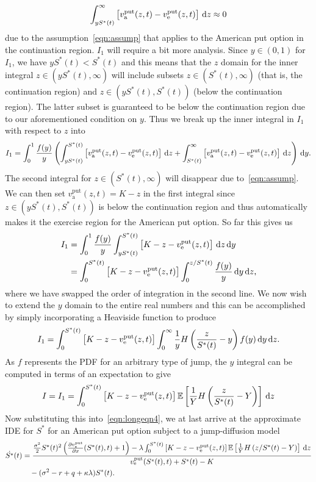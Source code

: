 	$$
		\int_{yS^*(t)}^\infty \left[v_{\text{a}}^{\text{put}}(z,t) -  v_{\text{e}}^{\text{put}}(z,t)\right] \, \mathrm d z \approx 0
	$$
due to the assumption~\eqref{eqn:assump} that applies to the American put option in the continuation region. $I_1$ will require a bit more analysis. Since $y \in (0,1)$ for $I_1$, we have $yS^*(t) < S^*(t)$ and this means that the $z$ domain for the inner integral $z \in (yS^*(t),\infty)$ will include subsets $z \in (S^*(t),\infty)$ (that is, the continuation region) and $z \in (yS^*(t),S^*(t))$ (below the continuation region). The latter subset is guaranteed to be below the continuation region due to our aforementioned condition on $y$. Thus we break up the inner integral in $I_1$ with respect to $z$ into
	$$
		I_1 = \int_0^1 \frac{f(y)}{y} \left( \int_{yS^*(t)}^{S^*(t)}  \left[v_{\text{a}}^{\text{put}}(z,t) -  v_{\text{e}}^{\text{put}}(z,t)\right] \, \mathrm d z +\int_{S^*(t)}^{\infty}  \left[v_{\text{a}}^{\text{put}}(z,t) -  v_{\text{e}}^{\text{put}}(z,t)\right] \, \mathrm d z \right) \, \mathrm d y.
	$$
The second integral for $z \in (S^*(t),\infty)$ will disappear due to~\eqref{eqn:assump}. We can then set $v_{\text{a}}^{\text{put}}(z,t) = K - z$ in the first integral since $z \in (yS^*(t),S^*(t))$ is below the continuation region and thus automatically makes it the exercise region for the American put option. So far this gives us
	\begin{align*}
		I_1 &= \int_0^1 \frac{f(y)}{y} \int_{yS^*(t)}^{S^*(t)}  \left[K - z -  v_{\text{e}}^{\text{put}}(z,t)\right] \, \mathrm d z \, \mathrm d y \\
		&= \int_0^{S^*(t)} \left[K - z -  v_{\text{e}}^{\text{put}}(z,t)\right]  \int_{0}^{z/S^*(t)} \frac{f(y)}{y}  \, \mathrm d y \, \mathrm d z,
	\end{align*}
	where we have swapped the order of integration in the second line. We now wish to extend the $y$ domain to the entire real numbers and this can be accomplished by simply incorporating a Heaviside function to produce
	$$
		I_1 = \int_0^{S^*(t)} \left[K - z -  v_{\text{e}}^{\text{put}}(z,t)\right]  \int_{0}^{\infty} \frac{1}{y}H\left( \frac{z}{S^*(t)} - y \right)f(y)  \, \mathrm d y \, \mathrm d z.
	$$
As $f$ represents the PDF for an arbitrary type of jump, the $y$ integral can be computed in terms of an expectation to give
	$$
		I = I_1 = \int_0^{S^*(t)} \left[K - z -  v_{\text{e}}^{\text{put}}(z,t)\right]  \mathbb E\left[ \frac{1}{Y}H\left( \frac{z}{S^*(t)} - Y \right) \right] \, \mathrm d z
	$$
Now substituting this into~\eqref{eqn:longeqn4}, we at last arrive at the approximate IDE for $S^*$ for an American put option subject to a jump-diffusion model
	\begin{equation}
		\label{eqn:SApproxPut}
		\begin{split}
		\dot{S^*}(t) &= \frac{\frac{\sigma^2}{2}S^*(t)^2\left( \frac{\partial  v_{\text{e}}^{\text{put}} }{\partial x}(S^*(t),t) + 1\right) - \lambda\int_0^{S^*(t)} \left[K - z -  v_{\text{e}}^{\text{put}}(z,t)\right]  \mathbb E\left[ \frac{1}{Y}H\left( z/S^*(t) - Y \right) \right] \, \mathrm d z}{ v_{\text{e}}^{\text{put}}(S^*(t),t) + S^*(t) - K} \\
				&\quad{} - (\sigma^2 - r + q +\kappa\lambda)S^*(t).
		\end{split}
	\end{equation}

